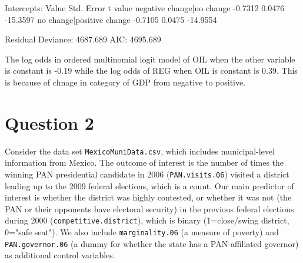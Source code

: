 \documentclass[12pt,letterpaper]{article}
\begin{document}
\begin{enumerate}
	Intercepts:  \newline
	Value    Std. Error t value \newline
	negative change|no change  -0.7312   0.0476   -15.3597\newline
	no change|positive change  -0.7105   0.0475   -14.9554\newline
	
	Residual Deviance: 4687.689 \newline
	AIC: 4695.689  
	
	The log odds in ordered multinomial logit model of OIL when the other variable is constant is -0.19 while the log odds of REG when OIL is constant is 0.39.  This is because of chnage in category of GDP from negative to positive.
\end{enumerate}

\section*{Question 2} 
\vspace{.25cm}

\noindent Consider the data set \texttt{MexicoMuniData.csv}, which includes municipal-level information from Mexico. The outcome of interest is the number of times the winning PAN presidential candidate in 2006 (\texttt{PAN.visits.06}) visited a district leading up to the 2009 federal elections, which is a count. Our main predictor of interest is whether the district was highly contested, or whether it was not (the PAN or their opponents have electoral security) in the previous federal elections during 2000 (\texttt{competitive.district}), which is binary (1=close/swing district, 0="safe seat"). We also include \texttt{marginality.06} (a measure of poverty) and \texttt{PAN.governor.06} (a dummy for whether the state has a PAN-affiliated governor) as additional control variables. 
\end{document}
